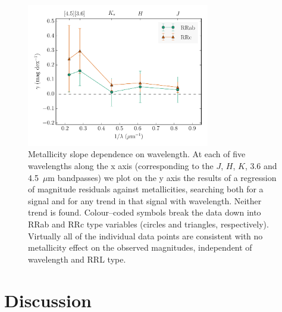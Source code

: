 \documentclass[a4paper,fleqn,usenatbib]{mnras}
\newcommand{\ocen}{$\omega$~Cen\xspace}
\newcommand{\um}{~$\mu$m\xspace}
\begin{document}
\begin{figure}
\begin{center}
\includegraphics[width=80mm, trim=0.75cm 0 0.5cm 0]{../ocen_only_fitting/final_plots/metallicity_slope_vs_wavelength.pdf}
\caption{Metallicity slope dependence on wavelength. At each of five
wavelengths along the x axis (corresponding to the $J$, $H$, $K$, 3.6 and 
4.5\um bandpasses) we plot on the y axis the results of a
regression of magnitude residuals against metallicities, searching
both for a signal and for any trend in that signal with
wavelength. Neither trend is found. Colour--coded symbols break the data
down into RRab and RRc type variables (circles and triangles,
respectively).
Virtually all of the individual data points are consistent with no
metallicity effect on the observed magnitudes, independent of
wavelength and RRL type.}
\label{fig:metallicity_slopes}
\end{center}
\end{figure}

\section{Discussion}
\label{sec:discussion}



\end{document}
